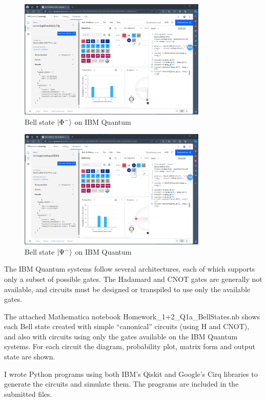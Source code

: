 \documentclass[12pt]{extarticle}
\begin{document}
\begin{enumerate}[(a)]
\begin{figure}[H]
\centering
\includegraphics[width=0.80\textwidth]{images/Bell-PhiMinus-IBM-Quantum.png}
\caption{Bell state $\ket{\Phi^{-}}$ on IBM Quantum}
\end{figure}
\begin{figure}[H]
\centering
\includegraphics[width=0.80\textwidth]{images/Bell-PsiMinus-IBM-Quantum.png}
\caption{Bell state $\ket{\Psi^{-}}$ on IBM Quantum}
\end{figure}

The IBM Quantum systems follow several architectures, each of which supports only a subset of possible gates.
The Hadamard and CNOT gates are generally not available, and circuits must be designed or transpiled
to use only the available gates.

The attached Mathematica notebook
Homework\_1+2\_Q1a\_BellStates.nb
shows each Bell state created with
simple ``canonical'' circuits (using H and CNOT), and also with circuits using only the gates available on the IBM Quantum systems.
For each circuit the diagram, probability plot, matrix form and output state are shown.

I wrote Python programs using both IBM's Qiskit and Google's Cirq libraries to generate the circuits and simulate them.
The programs are included in the submitted files.


\end{enumerate}
\end{document}
